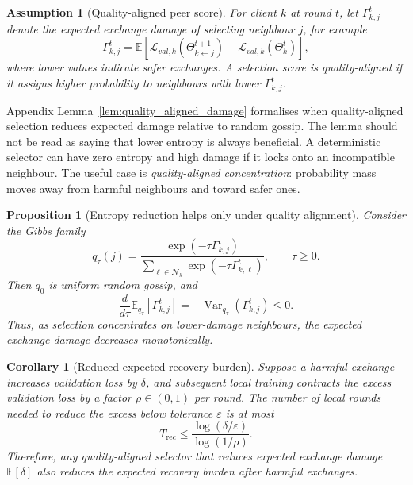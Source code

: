 \documentclass[conference]{IEEEtran}
\newtheorem{assumption}{Assumption}
\newtheorem{proposition}{Proposition}
\newtheorem{corollary}{Corollary}
\begin{document}
\begin{assumption}[Quality-aligned peer score]
\label{ass:quality_aligned_score}
For client \(k\) at round \(t\), let \(\Gamma_{k,j}^t\) denote the expected exchange damage of selecting neighbour \(j\), for example
\begin{equation*}
\Gamma_{k,j}^t
=
\mathbb{E}\!\left[
\mathcal{L}_{val,k}(\Theta_{k\leftarrow j}^{t+1})
-
\mathcal{L}_{val,k}(\Theta_k^t)
\right],
\end{equation*}
where lower values indicate safer exchanges. A selection score is quality-aligned if it assigns higher probability to neighbours with lower \(\Gamma_{k,j}^t\).
\end{assumption}

Appendix Lemma~\ref{lem:quality_aligned_damage} formalises when quality-aligned selection reduces expected damage relative to random gossip. The lemma should not be read as saying that lower entropy is always beneficial. A deterministic selector can have zero entropy and high damage if it locks onto an incompatible neighbour. The useful case is \emph{quality-aligned concentration}: probability mass moves away from harmful neighbours and toward safer ones.

\begin{proposition}[Entropy reduction helps only under quality alignment]
\label{prop:entropy_quality_alignment}
Consider the Gibbs family
\begin{equation*}
q_{\tau}(j)
=
\frac{\exp(-\tau \Gamma_{k,j}^t)}
{\sum_{\ell\in\mathcal{N}_k}\exp(-\tau \Gamma_{k,\ell}^t)},
\qquad
\tau\geq0 .
\end{equation*}
Then \(q_0\) is uniform random gossip, and
\begin{equation*}
\frac{d}{d\tau}
\mathbb{E}_{q_\tau}[\Gamma_{k,j}^t]
=
-
\operatorname{Var}_{q_\tau}(\Gamma_{k,j}^t)
\leq0.
\end{equation*}
Thus, as selection concentrates on lower-damage neighbours, the expected exchange damage decreases monotonically.
\end{proposition}

\begin{corollary}[Reduced expected recovery burden]
\label{cor:recovery_burden}
Suppose a harmful exchange increases validation loss by \(\delta\), and subsequent local training contracts the excess validation loss by a factor \(\rho\in(0,1)\) per round. The number of local rounds needed to reduce the excess below tolerance \(\varepsilon\) is at most
\begin{equation*}
T_{\mathrm{rec}}
\leq
\frac{\log(\delta/\varepsilon)}{\log(1/\rho)}.
\end{equation*}
Therefore, any quality-aligned selector that reduces expected exchange damage \(\mathbb{E}[\delta]\) also reduces the expected recovery burden after harmful exchanges.
\end{corollary}
\end{document}
